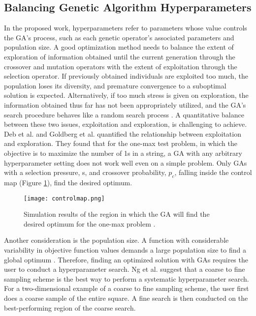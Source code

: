 \subsection{Balancing Genetic Algorithm Hyperparameters}
In the proposed work, hyperparameters refer to parameters whose value controls 
the \gls{GA}'s process, such as each genetic operator's associated parameters 
and population size.  
A good optimization method needs to balance the extent of exploration of 
information obtained until the current generation through the crossover 
and mutation operators with the extent of exploitation through the selection
operator. 
If previously obtained individuals are exploited too much, the population loses 
its diversity, and premature convergence to a suboptimal solution is expected. 
Alternatively, if too much stress is given on exploration, the information obtained 
thus far has not been appropriately utilized, and the \gls{GA}'s search procedure 
behaves like a random search process \cite{deb_multi-objective_2001}. 
A quantitative balance between these two issues, exploitation and exploration, 
is challenging to achieve. 
Deb et al. \cite{deb_multi-objective_2001} and Goldberg et al. 
\cite{goldberg_toward_1993} quantified the relationship between exploitation 
and exploration. 
They found that for the one-max test problem, in which the objective is to 
maximize the number of 1s in a string, a \gls{GA} with any arbitrary 
hyperparameter setting does not work well even on a simple problem. 
Only \glspl{GA} with a selection pressure, s, and crossover probability, $p_c$, 
falling inside the control map (Figure \ref{fig:controlmap}), find the desired 
optimum.  


\begin{figure}[H]
    \centering
    \texttt{[image: controlmap.png]} 
    \caption{Simulation results of the region in which the \gls{GA} will find the 
    desired optimum for the one-max problem 
    \cite{goldberg_toward_1993,deb_multi-objective_2001}.}
    \label{fig:controlmap}
\end{figure}

Another consideration is the population size. 
A function with considerable variability in objective function values demands 
a large population size to find a global optimum \cite{deb_multi-objective_2001}. 
Therefore, finding an optimized solution with \glspl{GA} requires the user 
to conduct a hyperparameter search. 
Ng et al. \cite{ng_improving_2021} suggest that a coarse to fine sampling scheme 
is the best way to perform a systematic hyperparameter search.  
For a two-dimensional example of a coarse to fine sampling scheme, the user 
first does a coarse sample of the entire square. 
A fine search is then conducted on the best-performing region of the coarse 
search. 

